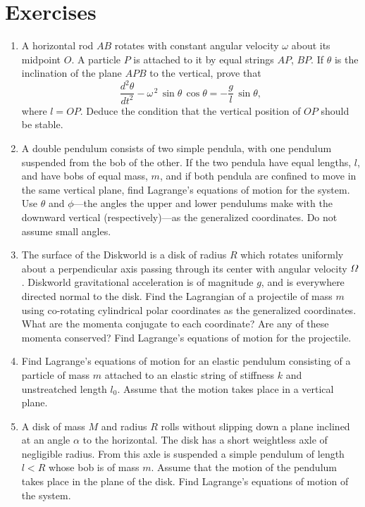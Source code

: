 \section{Exercises}
{\small
\renewcommand{\theenumi}{9.\arabic{enumi}}
\begin{enumerate}
\item A horizontal rod $AB$ rotates with constant angular velocity $\omega$ about
its midpoint $O$. A particle $P$ is attached to it by equal strings $AP$, $BP$.
If $\theta$ is the inclination of the plane $APB$ to the vertical, prove that
$$
\frac{d^2\theta}{dt^2} -\omega^{\,2}\,\sin\theta\,\cos\theta = -\frac{g}{l}\,\sin\theta,
$$
where $l=OP$. Deduce the condition that the vertical position of $OP$ should be stable.

\item A double pendulum consists of two simple pendula, with one pendulum
suspended from the bob of the other. If the two pendula have equal lengths, $l$,
and have bobs of equal mass, $m$, and if both pendula are confined to move in the
same vertical plane, find Lagrange's equations of motion for the system. 
Use $\theta$ and $\phi$---the angles the upper and
lower pendulums  make with the downward vertical (respectively)---as the
generalized coordinates. Do
not assume small angles.
\item The surface of the Diskworld is a disk of radius $R$ which
rotates uniformly about a perpendicular axis passing through
its center with angular velocity ${\mit\Omega}$. Diskworld gravitational acceleration is of magnitude
$g$, and is everywhere directed normal to the disk.
Find the Lagrangian
of a projectile of mass $m$ using co-rotating cylindrical polar coordinates as the generalized
coordinates. What are the momenta conjugate to each coordinate? Are
any of these momenta conserved? Find Lagrange's equations of motion for
the projectile.
\item Find  Lagrange's equations of motion for  an elastic pendulum consisting of a particle
of mass $m$ attached to an elastic string of stiffness $k$ and unstreatched
length $l_0$. Assume that the motion takes place in a vertical plane.

\item A disk of mass $M$ and radius $R$ rolls without slipping down a plane inclined at an angle $\alpha$ to the horizontal.
The disk has a short weightless axle of negligible radius. From this axle is suspended a simple pendulum
of length $l< R$ whose bob is of mass $m$. Assume that the motion of the pendulum takes place in the
plane of the disk. Find Lagrange's equations of motion of the system.


\end{enumerate}}
